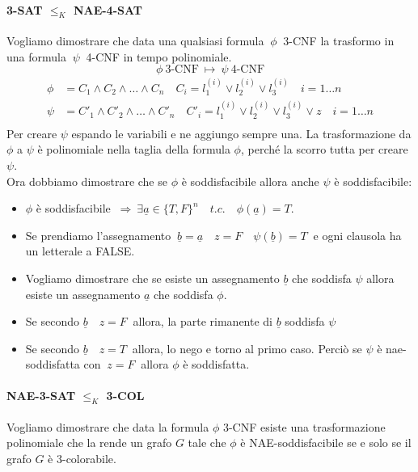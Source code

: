 \documentclass[a4paper]{article}
\theoremstyle{definition}
\begin{document}
		\paragraph{3-SAT $ \leq_K $ NAE-4-SAT} Vogliamo dimostrare che data una qualsiasi formula $\ \phi \ $ 3-CNF la trasformo in una formula $\ \psi \ $ 4-CNF in tempo polinomiale.
		\[
	 		 \phi \ \text{3-CNF} \ \longmapsto \ \psi \ \text{4-CNF}
		\]
		\begin{align*}
			\phi &= C_1 \wedge C_2 \wedge \dots \wedge C_n \quad C_i = l^{(i)}_1 \vee l^{(i)}_2 \vee l^{(i)}_3 \quad i = 1 \dots n \\
			\psi &= C'_1 \wedge C'_2 \wedge \dots \wedge C'_n \quad C'_i = l^{(i)}_1 \vee l^{(i)}_2 \vee l^{(i)}_3 \vee z \quad i = 1 \dots n \\
		\end{align*}
		Per creare $ \psi $ espando le variabili e ne aggiungo sempre una. 
		La trasformazione da $ \phi $ a $ \psi $ è polinomiale nella taglia della formula $ \phi $, perché la scorro tutta per creare $ \psi $.\\
		Ora dobbiamo dimostrare che se $ \phi $ è soddisfacibile allora anche $ \psi $ è soddisfacibile:
		\begin{itemize}
			\item $ \phi $ è soddisfacibile $ \ \Rightarrow \ \exists \underline{a} \in \{T,F\}^n \quad t.c.\quad \phi(\underline{a}) = T $.
			\item Se prendiamo l'assegnamento $ \ \underline{b} = \underline{a} \quad z = F \quad \psi(\underline{b}) = T\ $ e ogni clausola ha un letterale a FALSE.
			\item Vogliamo dimostrare che se esiste un assegnamento $ \underline{b} $ che soddisfa $ \psi $ allora esiste un assegnamento $ \underline{a} $ che soddisfa $ \phi $.
			\item Se secondo $ \underline{b}\quad z = F\ $ allora, la parte rimanente di $ \underline{b} $ soddisfa $ \psi $
			\item Se secondo $ \underline{b}\quad z = T\ $ allora, lo nego e torno al primo caso. Perciò se $ \psi $ è nae-soddisfatta con $ \ z = F\ $ allora $ \phi $ è soddisfatta. 
		\end{itemize}
		
		\paragraph{NAE-3-SAT $ \leq_K $ 3-COL } Vogliamo dimostrare che data la formula $ \phi $ 3-CNF esiste una trasformazione polinomiale che la rende un grafo $ G $ tale che $ \phi $ è NAE-soddisfacibile se e solo se il grafo $ G $ è 3-colorabile.
			 		
\end{document}

